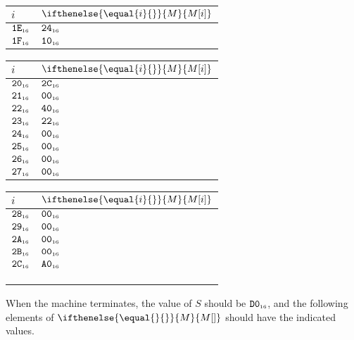 \documentclass[a4paper,12pt]{article}
\makeatletter
\newcommand{\num}[1]{\texttt{#1}}
\newcommand{\hex}[1]{\num{#1}_{\textup{\tiny 16}}}
\newcommand{\MEM}[1]{\ifthenelse{\equal{#1}{}}{M}{M[#1]}}
\newcommand{\SP}{S}
\newenvironment{memtable}{%
  \begin{trivlist}
    \item
    }{%
    \end{trivlist}}
\newenvironment{memcolumn}{%
  \begin{tabular}{@{}ll@{}}
    $i$ & $\MEM{i}$ \\
    \hline}
    {%
    \hline
  \end{tabular}}
\newcommand{\memspace}{\qquad}
\makeatother
\begin{document}
\begin{memtable}
\begin{memcolumn}
    $\hex{1E}$ & $\hex{24}$ \\
    $\hex{1F}$ & $\hex{10}$ \\
  \end{memcolumn}
  \memspace
  \begin{memcolumn}
    $\hex{20}$ & $\hex{2C}$ \\
    $\hex{21}$ & $\hex{00}$ \\
    $\hex{22}$ & $\hex{40}$ \\
    $\hex{23}$ & $\hex{22}$ \\
    $\hex{24}$ & $\hex{00}$ \\
    $\hex{25}$ & $\hex{00}$ \\
    $\hex{26}$ & $\hex{00}$ \\
    $\hex{27}$ & $\hex{00}$ \\
  \end{memcolumn}
  \memspace
  \begin{memcolumn}
    $\hex{28}$ & $\hex{00}$ \\
    $\hex{29}$ & $\hex{00}$ \\
    $\hex{2A}$ & $\hex{00}$ \\
    $\hex{2B}$ & $\hex{00}$ \\
    $\hex{2C}$ & $\hex{A0}$ \\
    \\
    \\
    \\
  \end{memcolumn}
\end{memtable}
When the machine terminates, the value of $\SP$ should be $\hex{D0}$, and the following elements of $\MEM{}$ should have the indicated values.
\end{document}
